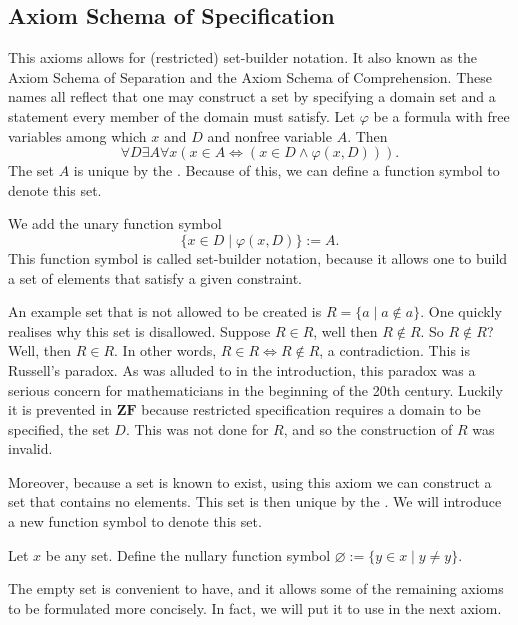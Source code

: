 \documentclass[../main.tex]{subfiles}
\begin{document}
\subsection*{Axiom Schema of Specification}\label{subsec:zermelo_fraenkel_set_theory:axiom_schema_of_specification}
This axioms allows for (restricted) set-builder notation. It also known as the Axiom Schema of Separation and the Axiom Schema of Comprehension. These names all reflect that one may construct a set by specifying a domain set and a statement every member of the domain must satisfy. Let $\varphi$ be a formula with free variables among which $x$ and $D$ and nonfree variable $A$. Then
\begin{equation*}
    \forall D\exists A\forall x(x\in A\iff(x\in D\land\varphi(x,D))).
\end{equation*}
The set $A$ is unique by the . Because of this, we can define a function symbol to denote this set.
\begin{definition}
    We add the unary function symbol
    \begin{equation*}
        \{x\in D\mid\varphi(x,D)\}:=A.
    \end{equation*}
    This function symbol is called set-builder notation, because it allows one to build a set of elements that satisfy a given constraint.
\end{definition}
An example set that is not allowed to be created is $R=\{a\mid a\notin a\}$. One quickly realises why this set is disallowed. Suppose $R\in R$, well then $R\notin R$. So $R\notin R$? Well, then $R\in R$. In other words, $R\in R\iff R\notin R$, a contradiction. This is Russell's paradox. As was alluded to in the introduction, this paradox was a serious concern for mathematicians in the beginning of the 20th century. Luckily it is prevented in $\mathbf{ZF}$ because restricted specification requires a domain to be specified, the set $D$. This was not done for $R$, and so the construction of $R$ was invalid.

Moreover, because a set is known to exist, using this axiom we can construct a set that contains no elements. This set is then unique by the . We will introduce a new function symbol to denote this set.
\begin{definition}
    Let $x$ be any set. Define the nullary function symbol $\varnothing:=\{y\in x\mid y\neq y\}$.
\end{definition}
The empty set is convenient to have, and it allows some of the remaining axioms to be formulated more concisely. In fact, we will put it to use in the next axiom.
\end{document}
